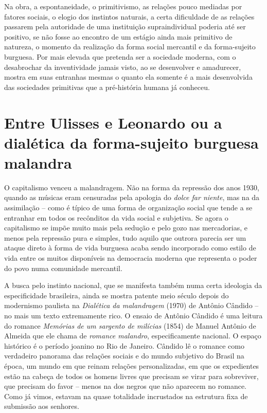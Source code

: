 Na obra, a espontaneidade, o primitivismo, as relações pouco mediadas
por fatores sociais, o elogio dos instintos naturais, a certa
dificuldade de as relações passarem pela autoridade de uma instituição
supraindividual poderia até ser positivo, se não fosse ao encontro de um
estágio ainda mais primitivo de natureza, o momento da realização da
forma social mercantil e da forma-sujeito burguesa. Por mais elevada que
pretenda ser a sociedade moderna, com o desabrochar da inventividade
jamais visto, ao se desenvolver e amadurecer, mostra em suas entranhas
mesmas o quanto ela somente é a mais desenvolvida das sociedades
primitivas que a pré-história humana já conheceu.

\section{Entre Ulisses e Leonardo ou a dialética da forma-sujeito burguesa malandra}

O capitalismo venceu a malandragem. Não na forma da repressão dos anos
1930, quando as músicas eram censuradas pela apologia do \emph{dolce far
niente}, mas na da assimilação -- como é típico de uma forma de
organização social que tende a se entranhar em todos os recônditos da
vida social e subjetiva. Se agora o capitalismo se impõe muito mais pela
sedução e pelo gozo nas mercadorias, e menos pela repressão pura e
simples, tudo aquilo que outrora parecia ser um ataque direto à forma de
vida burguesa acaba sendo incorporado como estilo de vida entre os
muitos disponíveis na democracia moderna que representa o poder do povo
numa comunidade mercantil.

A busca pelo instinto nacional, que se manifesta também numa certa
ideologia da especificidade brasileira, ainda se mostra patente meio
século depois do modernismo paulista na \emph{Dialética da malandragem}
(1970) de Antônio Cândido -- no mais um texto extremamente rico. O
ensaio de Antônio Cândido é uma leitura do romance \emph{Memórias de um
sargento de milícias} (1854) de Manuel Antônio de Almeida que ele chama
de \emph{romance malandro}, especificamente nacional. O espaço histórico
é o período joanino no Rio de Janeiro. Cândido lê o romance como
verdadeiro panorama das relações sociais e do mundo subjetivo do Brasil
na época, um mundo em que reinam relações personalizadas, em que os
expedientes estão na cabeça de todos os homens livres que precisam se
virar para sobreviver, que precisam do favor -- menos na dos negros que
não aparecem no romance. Como já vimos, estavam na quase totalidade
incrustados na estrutura fixa de submissão aos senhores.

